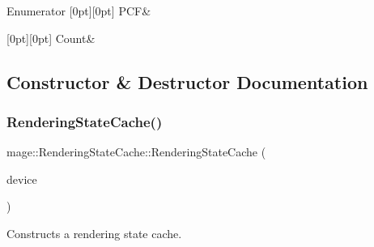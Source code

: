 \begin{DoxyEnumFields}{Enumerator}
[0pt][0pt]{}\hypertarget{structmage_1_1_rendering_state_cache_a4e1d4796699929e0618ff54621910770a0a4faf97013814ceb7f7afe1205a516b}{}\label{structmage_1_1_rendering_state_cache_a4e1d4796699929e0618ff54621910770a0a4faf97013814ceb7f7afe1205a516b} 
P\+CF&\\
\hline

[0pt][0pt]{}\hypertarget{structmage_1_1_rendering_state_cache_a4e1d4796699929e0618ff54621910770ae93f994f01c537c4e2f7d8528c3eb5e9}{}\label{structmage_1_1_rendering_state_cache_a4e1d4796699929e0618ff54621910770ae93f994f01c537c4e2f7d8528c3eb5e9} 
Count&\\
\hline

\end{DoxyEnumFields}


\subsection{Constructor \& Destructor Documentation}
\hypertarget{structmage_1_1_rendering_state_cache_ad818eaa6c950c5851d6e684b9a4b3a65}{}\label{structmage_1_1_rendering_state_cache_ad818eaa6c950c5851d6e684b9a4b3a65} 
\subsubsection{\texorpdfstring{Rendering\+State\+Cache()}{RenderingStateCache()}\hspace{0.1cm}{\footnotesize\ttfamily [1/3]}}
{\footnotesize\ttfamily mage\+::\+Rendering\+State\+Cache\+::\+Rendering\+State\+Cache (\begin{DoxyParamCaption}\item[{I\+D3\+D11\+Device2 $\ast$}]{device }\end{DoxyParamCaption})\hspace{0.3cm}{\ttfamily [explicit]}}

Constructs a rendering state cache.

